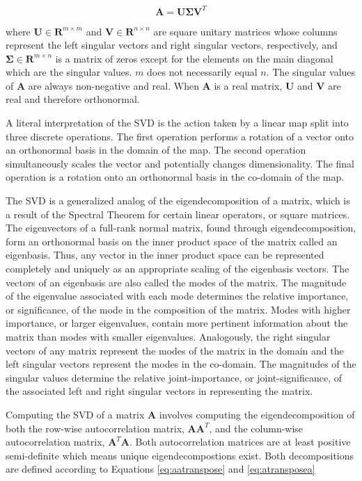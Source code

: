 \documentclass[conference]{IEEEtran}
\begin{document}
    \begin{equation}
        \mathbf{A} = \mathbf{U\Sigma }{\mathbf{V}^T}
    \label{eq:svddef}
    \end{equation}

    where $\mathbf{U} \in \mathbf{R}^{m \times m}$ and $\mathbf{V} \in \mathbf{R}^{n \times n}$ are square unitary
    matrices whose columns represent the left singular vectors and right singular vectors, respectively, and $\mathbf{\Sigma} \in \mathbf{R}^{m \times n}$ is a matrix of zeros except for the elements on the main diagonal which are the singular values. $m$ does not necessarily equal $n$. The singular values of $\mathbf{A}$ are always non-negative and real. When $\mathbf{A}$ is a real matrix, $\mathbf{U}$ and $\mathbf{V}$ are real and therefore orthonormal.

    A literal interpretation of the SVD is the action taken by a linear map split into three discrete operations. The first operation performs a rotation of a vector onto an orthonormal basis in the domain of the map. The second operation simultaneously scales the vector and potentially changes dimensionality. The final operation is a rotation onto an orthonormal basis in the co-domain of the map.

    The SVD is a generalized analog of the eigendecomposition of a matrix, which is a result of the Spectral Theorem for certain linear operators, or square matrices. The eigenvectors of a full-rank normal matrix, found through eigendecomposition, form an orthonormal basis on the inner product space of the matrix called an eigenbasis. Thus, any vector in the inner product space can be represented completely and uniquely as an appropriate scaling of the eigenbasis vectors. The vectors of an eigenbasis are also called the modes of the matrix. The magnitude of the eigenvalue associated with each mode determines the relative importance, or significance, of the mode in the composition of the matrix. Modes with higher importance, or larger eigenvalues, contain more pertinent information about the matrix than modes with smaller eigenvalues. Analogously, the right singular vectors of any matrix represent the modes of the matrix in the domain and the left singular vectors represent the modes in the co-domain. The magnitudes of the singular values determine the relative joint-importance, or joint-significance, of the associated left and right singular vectors in representing the matrix.

    Computing the SVD of a matrix $\mathbf{A}$ involves computing the eigendecomposition of both the row-wise autocorrelation matrix, $\mathbf{AA}^T$, and the column-wise autocorrelation matrix, $\mathbf{A}^T\mathbf{A}$. Both autocorrelation matrices are at least positive semi-definite which means unique eigendecompostions exist. Both decompositions are defined according to Equations \ref{eq:aatranspose} and \ref{eq:atransposea}
\end{document}
